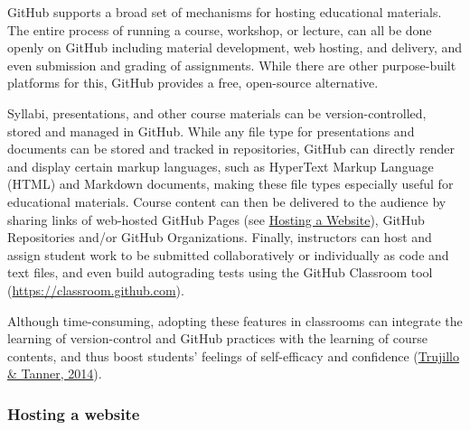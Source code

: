 GitHub supports a broad set of mechanisms for hosting educational materials.
The entire process of running a course, workshop, or lecture, can all be done openly on GitHub including material development, web hosting, and delivery, and even submission and grading of assignments.
While there are other purpose-built platforms for this, GitHub provides a free, open-source alternative.

Syllabi, presentations, and other course materials can be version-controlled, stored and managed in GitHub.
While any file type for presentations and documents can be stored and tracked in repositories, GitHub can directly render and display certain markup languages, such as HyperText Markup Language (HTML) and Markdown documents, making these file types especially useful for educational materials.
Course content can then be delivered to the audience by sharing links of web-hosted GitHub Pages (see \protect\hyperlink{hosting-a-website}{Hosting a Website}), GitHub Repositories and/or GitHub Organizations.
Finally, instructors can host and assign student work to be submitted collaboratively or individually as code and text files, and even build autograding tests using the GitHub Classroom tool (\url{https://classroom.github.com}).

Although time-consuming, adopting these features in classrooms can integrate the learning of version-control and GitHub practices with the learning of course contents, and thus boost students' feelings of self-efficacy and confidence (\protect\hyperlink{ref-dqrFjoSb}{Trujillo \& Tanner, 2014}).

\hypertarget{hosting-a-website}{%
\subsubsection{Hosting a website}\label{hosting-a-website}}

